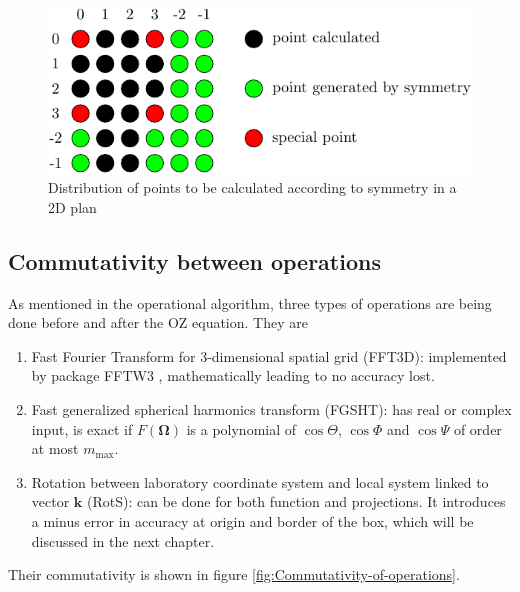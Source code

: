 \begin{figure}[h]
\begin{centering}
\includegraphics{_figure/test_lmn}
\par\end{centering}

\caption{Distribution of points to be calculated according to symmetry in a
2D plan}
\end{figure}



\subsection{Commutativity between operations\label{sub:Commutativity-between-operations}}

As mentioned in the operational algorithm, three types of operations
are being done before and after the OZ equation. They are
\begin{enumerate}
\item Fast Fourier Transform for 3-dimensional spatial grid (FFT3D): implemented
by package FFTW3 \citep{FFTW3}, mathematically leading to no accuracy
lost.
\item Fast generalized spherical harmonics transform (FGSHT): has real
or complex input, is exact if $F(\mathbf{\Omega})$ is a polynomial
of $\cos\Theta$, $\cos\Phi$ and $\cos\Psi$ of order at most $m_{\mathrm{max}}$.
\item Rotation between laboratory coordinate system and local system linked
to vector $\mathbf{k}$ (RotS): can be done for both function and
projections. It introduces a minus error in accuracy at origin and
border of the box, which will be discussed in the next chapter.
\end{enumerate}
Their commutativity is shown in figure \ref{fig:Commutativity-of-operations}.

